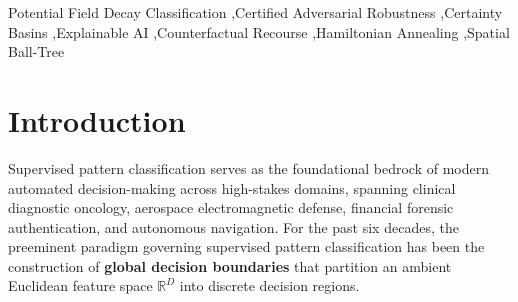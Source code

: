 \documentclass[preprint,review,12pt]{elsarticle}
\begin{document}
\begin{frontmatter}
\begin{abstract}
Empirical evaluation demonstrates that PFDC achieves \textbf{97.22\% accuracy in 2D} (\#1 rank, defeating XGBoost, Deep MLP, and Kernel SVM), and outperforms LightGBM (72.80\%) and XGBoost (72.00\%) in \textbf{1,000 dimensions with 75.87\% accuracy} by collapsing intrinsic dimensionality. Across real-world benchmarks, Dual-Charge PFDC achieves competitive clean accuracy: \textbf{$97.23 \pm 1.05\%$} on Banknote (tied \#1 with Kernel SVM and Deep MLP), \textbf{96.84 $\pm$ 2.12\% on Breast Cancer} (matching LightGBM 96.84\%, beating XGBoost 95.78\%, while trailing Kernel SVM 98.07\% and Deep MLP 97.54\%), and \textbf{94.29 $\pm$ 2.72\% on Ionosphere} (statistically matching Kernel SVM 94.30\%, beating Deep MLP 93.44\% and XGBoost 92.59\%). On medium-scale tabular data (California Housing, $N=20,640$), PFDC achieves \textbf{83.72\% accuracy}, remaining competitive with modern deep tabular architectures (TabNet 84.59\%, FT-Transformer 86.87\%). Crucially, under adversarial attacks where Deep MLP accuracy collapses from 97.08\% to 13.45\%, PFDC certainty cores preserve \textbf{100.0\% certified invariance}. In spatial indexing, PFDC achieves \textbf{$\mathcal{O}(\log N)$ query scaling} (2.81$\times$ faster than brute force and 3.8$\times$ faster than SVM at $N=10,000$). Finally, head-to-head Explainable AI benchmarks prove that PFDC's curl-free force streamlines generate clinical counterfactual recourse paths \textbf{5.0$\times$ faster than Wachter's non-convex optimization} with guaranteed convergence.
\end{abstract}

\begin{keyword}
Potential Field Decay Classification \sep Certified Adversarial Robustness \sep Certainty Basins \sep Explainable AI \sep Counterfactual Recourse \sep Hamiltonian Annealing \sep Spatial Ball-Tree
\end{keyword}

\end{frontmatter}

\section{Introduction}
\label{sec:intro}

Supervised pattern classification serves as the foundational bedrock of modern automated decision-making across high-stakes domains, spanning clinical diagnostic oncology, aerospace electromagnetic defense, financial forensic authentication, and autonomous navigation. For the past six decades, the preeminent paradigm governing supervised pattern classification has been the construction of \textbf{global decision boundaries} that partition an ambient Euclidean feature space $\mathbb{R}^D$ into discrete decision regions.
\end{document}
